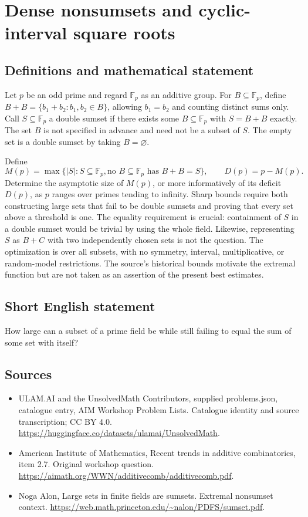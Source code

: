 \documentclass[11pt,a4paper]{article}
\begin{document}
\section*{Dense nonsumsets and cyclic-interval square roots}\label{statement}

\subsection{Definitions and mathematical statement}
Let $p$ be an odd prime and regard $\mathbb F_p$ as an additive group.
For $B\subseteq\mathbb F_p$, define
$B+B=\{b_1+b_2:b_1,b_2\in B\}$, allowing $b_1=b_2$ and counting distinct sums only.
Call $S\subseteq\mathbb F_p$ a double sumset if there exists some $B\subseteq\mathbb F_p$ with $S=B+B$ exactly.
The set $B$ is not specified in advance and need not be a subset of $S$.
The empty set is a double sumset by taking $B=\varnothing$.

Define
\[
 M(p)=\max\{|S|:S\subseteq\mathbb F_p,
                   \text{no }B\subseteq\mathbb F_p\text{ has }B+B=S\},
 \qquad D(p)=p-M(p).
\]
Determine the asymptotic size of $M(p)$, or more informatively of its deficit $D(p)$, as $p$ ranges over primes tending to infinity.
Sharp bounds require both constructing large sets that fail to be double sumsets and proving that every set above a threshold is one.
The equality requirement is crucial: containment of $S$ in a double sumset would be trivial by using the whole field.
Likewise, representing $S$ as $B+C$ with two independently chosen sets is not the question.
The optimization is over all subsets, with no symmetry, interval, multiplicative, or random-model restrictions.
The source's historical bounds motivate the extremal function but are not taken as an assertion of the present best estimates.
\subsection{Short English statement}
How large can a subset of a prime field be while still failing to equal the sum of some set with itself?
\subsection{Sources}
\begin{itemize}
\item[S1] ULAM.AI and the UnsolvedMath Contributors, supplied problems.json, catalogue entry, AIM Workshop Problem Lists. Catalogue identity and source transcription; CC BY 4.0.
\url{https://huggingface.co/datasets/ulamai/UnsolvedMath}.
\item[S2] American Institute of Mathematics, Recent trends in additive combinatorics, item 2.7. Original workshop question.
\url{https://aimath.org/WWN/additivecomb/additivecomb.pdf}.
\item[S3] Noga Alon, Large sets in finite fields are sumsets. Extremal nonsumset context.
\url{https://web.math.princeton.edu/~nalon/PDFS/sumset.pdf}.
\end{itemize}
\end{document}
